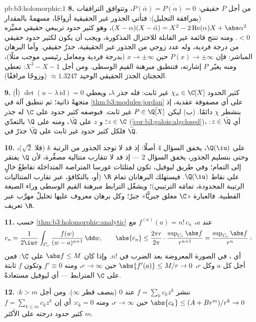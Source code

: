 \begin{solution}{pb:b3:holomorphic:1}
\textbf{8.} من أجل $P$ حقيقي: $P(\bar\alpha) =
\overline{P(\alpha)} = 0$، وتتوافق الترافقات (بمرافقة
التحليل): فتأتي الجذور غير الحقيقية أزواجًا، مسهمةً بالمقدار
$(X - \alpha)(X - \bar\alpha) = X^2 -
2\operatorname{Re}(\alpha)X + \abs\alpha^2$، وهو كثير حدود تربيعي حقيقي مميِّزه $< 0$. ومنه تنتج
قائمة غير القابلة للاختزال المذكورة، ويجب أن يكون لكثير حدود
حقيقي من درجة فردية، وله عدد زوجي من الجذور غير الحقيقية، جذرٌ
حقيقي. وأما البرهان المباشر: فإن $P(x) \to \pm\infty$ حين $x \to \pm\infty$ (بدرجة
فردية ومعامل رئيسي موجب مثلًا)، ومنه يغيّر $P$ إشارته، فتنطبق
مبرهنة القيم الوسطى. ومن أجل $X^3 - X - 1$: تعطي الحجتان
الجذرَ الحقيقي الوحيد $\approx 1.3247$ (وزوجًا مرافقًا).

\textbf{9.} (أ) كثير الحدود $\chi_u \in \C[X]$ غير ثابت: فله جذر $\lambda$،
ويعطي $\det(u - \lambda\,\mathrm{id}) = 0$ متجهةً ذاتية؛ ثم تنطبق آلة  في
\cref{thm:b3:modules:jordan} على أي مصفوفة عقدية، إذ ينشطر $\chi$ دائمًا.
(ب) ليكن $P \in \bar\Q[X]$ غير ثابت. فبوصفه كثير حدود على $\C$ له جذر
$z
\in \C$؛ و $z$  على $\bar\Q$، ومنه على $\Q$ بالتعدّي
(\cref{cor:b3:galois:algclosed})، أي $z \in
\bar\Q$: فلكل كثير حدود غير ثابت على $\bar\Q$
جذرٌ في $\bar\Q$.

\textbf{10.} على $\Q(\iu)$، يخفق السؤال 4 أصلًا: إذ قد لا توجد
الجذور من الرتبة $k$ (فلا $\sqrt2$)، وحتى بتسليم الجذور، يخفق
السؤال 2 --- إذ قد لا تتقارب متتالية مصغِّرة، لأن $\Q$ يفتقر
إلى التمام؛ وفي طريق ليوفيل، تكون لمثلثات غورسا المتراصة
المتداخلة تقاطعٌ خالٍ على نقاط $\Q(\iu)$. فيستهلك البرهانان
تمامَ $\R$ (أو، بالتكافؤ، عبر تقارب المتتاليات الرتيبة
المحدودة، تمامَه الترتيبي)؛ ويشغّل الترابط مبرهنة القيم
الوسطى وراء الصيغة القطبية. فالعبارة «$\C$ مغلق جبريًّا»
جبرٌ؛ وكل برهان معروف عليها تحليلٌ مهرَّب عبر تعريف $\R$.

\textbf{11.} حسب \cref{thm:b3:holomorphic:analytic} عند $a$، $f^{(n)}(a) = n!\,c_n$ مع
\[
c_n = \frac1{2\iu\pi}\int_{C_r}\frac{f(w)}{(w -
a)^{n+1}}\,\dd w,
\qquad
\abs{c_n} \leq \frac{2\pi r}{2\pi}\cdot
\frac{\sup_{C_r}\abs f}{r^{n+1}}
= \frac{\sup_{C_r}\abs f}{r^{n}} :
\]
أي ، في الصورة المعروضة بعد الضرب في $n!$. وإذا كان
$\abs f \leq M$ على $\C$: فمن أجل كل $a$ وكل $r$، $\abs{f'(a)} \leq M/r \to 0$ حين
$r \to
\infty$، ومنه $f' \equiv 0$ وتكون $f$ ثابتة على $\C$ المترابط
--- أي ليوفيل مستعادةً.

\textbf{12.} ننشر $f = \sum_kc_kz^k$ عند $0$ (بنصف قطر $\infty$). ومن أجل
$k > m$: $\abs{c_k} \leq (A + Br^m)/r^k \to
0$ حين $r \to \infty$، ومنه $c_k = 0$: أي إن
$f =
\sum_{k\leq m}c_kz^k$ كثير حدود درجته على الأكثر $m$.


\end{solution}
